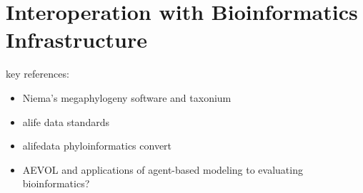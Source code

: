 \section{Interoperation with Bioinformatics Infrastructure}
\label{sec:interoperation}

key references:
\begin{itemize}
\item Niema's megaphylogeny software \citep{moshiri2025compacttree, moshiri2020treeswift} and taxonium \citep{sanderson2022taxonium}
\item alife data standards \citep{lalejini2019data}
\item alifedata phyloinformatics convert \citep{moreno2024apc}
\item AEVOL and applications of agent-based modeling to evaluating bioinformatics?
\end{itemize}


